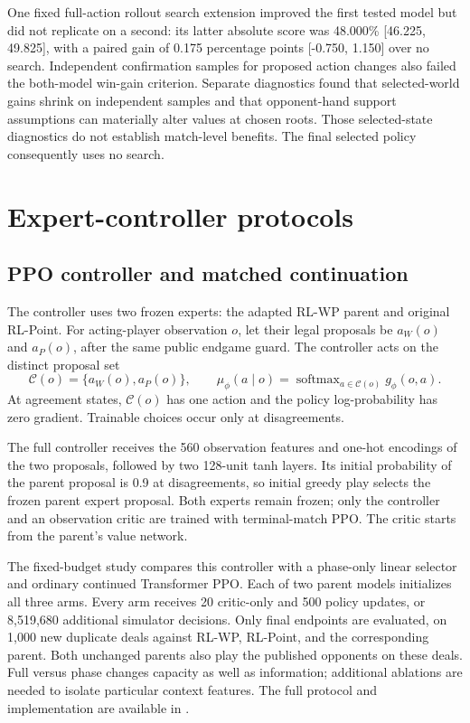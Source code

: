\documentclass[11pt]{article}
\begin{document}
One fixed full-action rollout search extension improved the first tested model
but did not replicate on a second: its latter absolute score was 48.000\%
[46.225, 49.825], with a paired gain of 0.175 percentage points
[-0.750, 1.150] over no search. Independent confirmation samples for proposed
action changes also failed the both-model win-gain criterion. Separate
diagnostics found that selected-world gains shrink on independent samples and
that opponent-hand support assumptions can materially alter values at chosen
roots. Those selected-state diagnostics do not establish match-level benefits.
The final selected policy consequently uses no search.

\section{Expert-controller protocols}
\label{app:controllers}
\subsection{PPO controller and matched continuation}
The controller uses two frozen experts: the adapted RL-WP parent and original
RL-Point. For acting-player observation $o$, let their legal proposals be
$a_W(o)$ and $a_P(o)$, after the same public endgame guard. The controller
acts on the distinct proposal set
\begin{equation}
 \mathcal C(o)=\{a_W(o),a_P(o)\},\qquad
 \mu_\phi(a\mid o)=\operatorname{softmax}_{a\in\mathcal C(o)}g_\phi(o,a).
\end{equation}
At agreement states, $\mathcal C(o)$ has one action and the policy
log-probability has zero gradient. Trainable choices occur only at disagreements.

The full controller receives the 560 observation features and one-hot encodings
of the two proposals, followed by two 128-unit tanh layers. Its initial
probability of the parent proposal is 0.9 at disagreements, so initial greedy
play selects the frozen parent expert proposal. Both experts remain frozen; only the controller
and an observation critic are trained with terminal-match PPO. The critic starts
from the parent's value network.

The fixed-budget study compares this controller with a phase-only
linear selector and ordinary continued Transformer PPO. Each of two parent
models initializes all three arms. Every arm receives 20 critic-only and 500
policy updates, or 8,519,680 additional simulator decisions. Only final
endpoints are evaluated, on 1,000 new duplicate deals against RL-WP, RL-Point,
and the corresponding parent. Both unchanged parents also play the published
opponents on these deals. Full versus phase changes capacity as well as
information; additional ablations are needed to isolate particular context
features. The full protocol and implementation are available in
.
\end{document}
